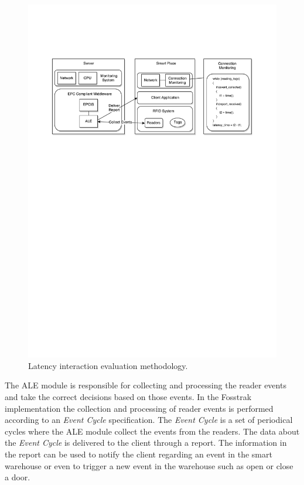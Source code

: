 \begin{figure}[ht!]
  \centering
  \includegraphics[width=.9\textwidth]{./images/eval_latency_methodology}
  \caption{Latency interaction evaluation methodology.}
  \label{fig:eval_latency_methodology}
\end{figure}

The \gls{ALE} module is responsible for collecting and processing the reader events and take the
correct decisions based on those events. In the Fosstrak implementation the collection and processing
of reader events is performed according to an \textit{Event Cycle} specification. The \textit{Event Cycle}
is a set of periodical cycles where the \gls{ALE} module collect the events from the readers. The data
about the \textit{Event Cycle} is delivered to the client through a report. The information in the report
can be used to notify the client regarding an event in the smart warehouse or even to trigger a new event
in the warehouse such as open or close a door.\\

